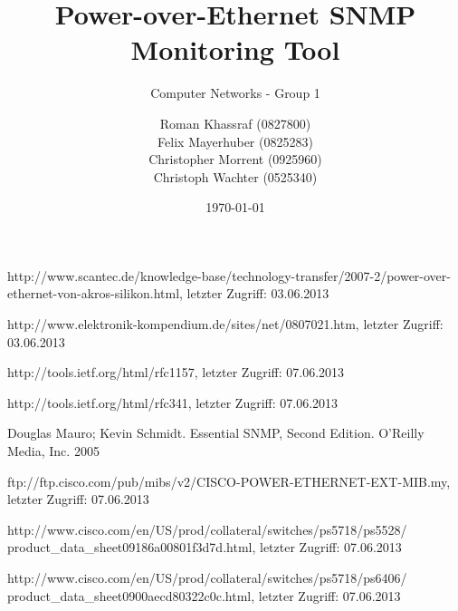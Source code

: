 \documentclass[a4paper, 12pt]{scrartcl}
\title{Power-over-Ethernet SNMP Monitoring Tool}
\subtitle{Computer Networks - Group 1}
\author{Roman Khassraf (0827800)\\ Felix Mayerhuber (0825283) \\ Christopher Morrent (0925960) \\ Christoph Wachter (0525340) }
\date{\today}
\begin{document}
\maketitle







\begin{thebibliography}{4}

 http://www.scantec.de/knowledge-base/technology-transfer/2007-2/power-over-ethernet-von-akros-silikon.html, letzter Zugriff: 03.06.2013

 http://www.elektronik-kompendium.de/sites/net/0807021.htm, letzter Zugriff: 03.06.2013

 http://tools.ietf.org/html/rfc1157, letzter Zugriff: 07.06.2013

 http://tools.ietf.org/html/rfc341, letzter Zugriff: 07.06.2013

 Douglas Mauro; Kevin Schmidt. Essential SNMP, Second Edition. O'Reilly Media, Inc. 2005

 ftp://ftp.cisco.com/pub/mibs/v2/CISCO-POWER-ETHERNET-EXT-MIB.my, letzter Zugriff: 07.06.2013

 http://www.cisco.com/en/US/prod/collateral/switches/ps5718/ps5528/\\product\_data\_sheet09186a00801f3d7d.html, letzter Zugriff: 07.06.2013

 http://www.cisco.com/en/US/prod/collateral/switches/ps5718/ps6406/\\product\_data\_sheet0900aecd80322c0c.html, letzter Zugriff: 07.06.2013

\end{thebibliography}
\end{document}
